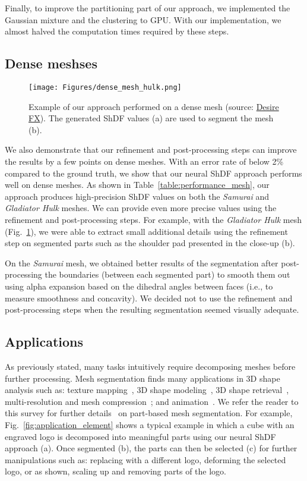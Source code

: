 Finally, to improve the partitioning part of our approach, we implemented the Gaussian mixture and the clustering to GPU. With our implementation, we almost halved the computation times required by these steps.

\subsection{Dense meshses}
\begin{figure}[h]
    \centering
    \texttt{[image: Figures/dense\_mesh\_hulk.png]}
    \caption{Example of our approach performed on a dense mesh (source: \href{https://desirefx.me/3d_models/gladiator-hulk-mesh-3d-model}{Desire FX}). The generated ShDF values (a) are used to segment the mesh (b).}
    \label{fig:densemesh}
\end{figure}
We also demonstrate that our refinement and post-processing steps can improve the results by a few points on dense meshes. With an error rate of below 2\% compared to the ground truth, we show that our neural ShDF approach performs well on dense meshes. As shown in Table~\ref{table:performance_mesh}, our approach produces high-precision ShDF values on both the \textsl{Samurai} and \textsl{Gladiator Hulk} meshes. We can provide even more precise values using the refinement and post-processing steps. For example, with the \textsl{Gladiator Hulk} mesh (Fig.~\ref{fig:densemesh}), we were able to extract small additional details using the refinement step on segmented parts such as the shoulder pad presented in the close-up (b).

On the \textsl{Samurai} mesh, we obtained better results of the segmentation after post-processing the boundaries (between each segmented part) to smooth them out using alpha expansion based on the dihedral angles between faces (i.e., to measure smoothness and concavity). We decided not to use the refinement and post-processing steps when the resulting segmentation seemed visually adequate.

\subsection{Applications}
As previously stated, many tasks intuitively require decomposing meshes before further processing. Mesh segmentation finds many applications in 3D shape analysis such as: texture mapping~\cite{sander2003multi}, 3D shape modeling~\cite{ji2006easy}, 3D shape retrieval~\cite{ferreira2010thesaurus}, multi-resolution and mesh compression~\cite{maglo2011cluster}; and animation~\cite{yuan2016space}. We refer the reader to this survey for further details~\cite{rodrigues2018part} on part-based mesh segmentation. For example, Fig.~\ref{fig:application_element} shows a typical example in which a cube with an engraved logo is decomposed into meaningful parts using our neural ShDF approach (a). Once segmented (b), the parts can then be selected (c) for further manipulations such as: replacing with a different logo, deforming the selected logo, or as shown, scaling up and removing parts of the logo.

